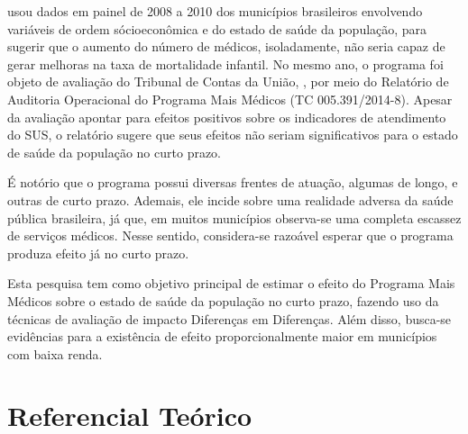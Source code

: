 \documentclass[twoside,onecolumn,12pt]{article}
\numberwithin{outputctr}{section}
\begin{document}
 usou dados em painel de 2008 a 2010 dos municípios brasileiros envolvendo variáveis de ordem sócioeconômica e do estado de saúde da população, para sugerir que o aumento do número de médicos, isoladamente,  não seria capaz de gerar melhoras na taxa de mortalidade infantil. No mesmo ano, o programa foi objeto de avaliação do Tribunal de Contas da União, , por meio do Relat\'{o}rio de Auditoria Operacional do Programa Mais M\'{e}dicos (TC 005.391/2014-8). Apesar da avaliação apontar para efeitos positivos sobre os indicadores de atendimento do SUS, o relatório sugere que seus efeitos não seriam significativos para o estado de saúde da população no curto prazo.

É notório que o programa possui diversas frentes de atua\c{c}\~{a}o, algumas de longo, e outras de curto prazo. Ademais, ele incide sobre uma realidade adversa da saúde pública brasileira, já que, em muitos municípios observa-se uma completa escassez de serviços médicos. Nesse sentido, considera-se razo\'{a}vel esperar que o programa produza efeito já no curto prazo.

Esta pesquisa tem como objetivo principal de estimar o efeito do Programa Mais M\'{e}dicos sobre o estado de sa\'{u}de da popula\c{c}\~{a}o no curto prazo, fazendo uso da técnicas de avaliação de impacto Diferenças em Diferenças. Além disso, busca-se evidências para a existência de efeito proporcionalmente maior em municípios com baixa renda.



\section{Referencial Te\'{o}rico \label{secReferencialTeorico}}
\end{document}
